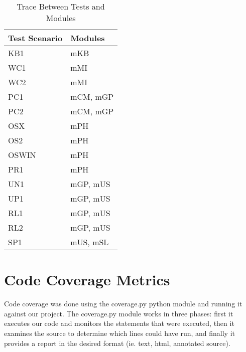 \documentclass[12pt, titlepage]{article}
\newcommand{\tref}[1]{T\ref{#1}}
\begin{document}
\begin{table}[h]
		\centering
		\begin{tabular}{p{} p{}}
			\toprule
			\textbf{Test Scenario} & \textbf{Modules}\\
			\midrule
			KB1 & mKB \\
			WC1 & mMI \\
			WC2 & mMI \\
			PC1 & mCM, mGP \\
			PC2 & mCM, mGP \\
			OSX & mPH\\
			OS2 & mPH\\
			OSWIN & mPH\\
			PR1 & mPH\\
			UN1 & mGP, mUS\\
			UP1 & mGP, mUS\\
			RL1 & mGP, mUS\\
			RL2 & mGP, mUS\\
			SP1 & mUS, mSL\\
			\bottomrule
		\end{tabular}
		\caption{Trace Between Tests and Modules}
		\label{TblTM}
	\end{table}


\section{Code Coverage Metrics}

Code coverage was done using the coverage.py python module and running it
against our project. The coverage.py module works in three phases: first it
executes our code and monitors the statements that were executed, then it
examines the source to determine which lines could have run, and finally it
provides a report in the desired format (ie. text, html, annotated source).




\end{document}
